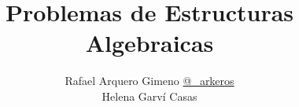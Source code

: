 \title{Problemas de Estructuras Algebraicas}
\author{
Rafael Arquero Gimeno 
\href{https://twitter.com/_arkeros}{@\_arkeros} \\
Helena Garví Casas
}